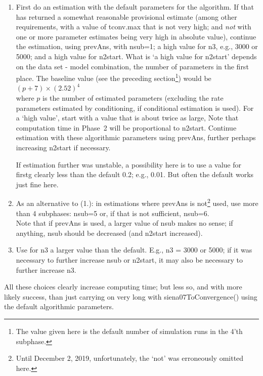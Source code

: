 \documentclass[a4paper,fleqn,11pt]{article}
\newcommand{\+}{\, + \,}
\newcommand{\sfn}[1]{\textsf{#1}}
\begin{document}
\begin{enumerate}
\item First do an estimation with the default parameters
    for the algorithm.
    If that has returned a somewhat reasonable provisional estimate
    (among other requirements, with a value of \sfn{tconv.max} that is
    not very high; and \emph{not} with one or more parameter estimates
    being very high in absolute value), continue the estimation, using \sfn{prevAns},
    with \sfn{nsub=1}; a high value for \sfn{n3}, e.g., 3000 or 5000;
    and a high value for \sfn{n2start}.
    What is `a high value for \sfn{n2start}' depends on the data set
    - model combination,
    the number of parameters in the first place.
    The baseline value (see the preceding section\footnote{The value given here
    is the default number of simulation runs in the 4'th subphase.})
    would be \\
    $(p+7)\times (2.52)^4$ \\
    where $p$ is the
    number of estimated parameters (excluding the rate parameters
    estimated by conditioning, if conditional estimation is used).
    For a `high value', start with a value that is about twice as large,
    Note that computation time in Phase~2 will be proportional to \sfn{n2start}.
    Continue estimation with these algorithmic parameters using \sfn{prevAns},
    further perhaps increasing \sfn{n2start} if necessary.

    If estimation further was unstable, a possibility here is to
    use a value for \sfn{firstg} clearly less than the default 0.2; e.g., 0.01.
    But often the default works just fine here.
\item As an alternative to (1.): in estimations where \sfn{prevAns} is
    not\footnote{Until December 2, 2019, unfortunately, the `not'
    was erroneously omitted here.} used,
    use more than 4 subphases: \sfn{nsub=5} or, if that is not sufficient,
    \sfn{nsub=6}.\\
    Note that if \sfn{prevAns} is used, a larger value of \sfn{nsub}
    makes no sense; if anything, \sfn{nsub} should be decreased
    (and \sfn{n2start} increased).
\item Use for \sfn{n3} a larger value than the default.
    E.g., \sfn{n3 = 3000} or \sfn{5000};
    if it was necessary to further increase \sfn{nsub} or \sfn{n2start}, it may also be
    necessary to further increase \sfn{n3}.
\end{enumerate}

All these choices clearly increase computing time; but less so, and with
more likely success, than just carrying on very long with \sfn{siena07ToConvergence()}
using the default algorithmic parameters.
\end{document}
